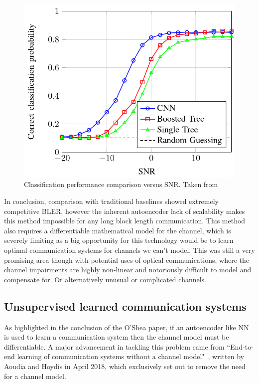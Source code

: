 \documentclass[12pt,onecolumn,letterpaper]{article}
\newcommand\genfigsize{0.5}
\begin{document}
\begin{figure}[t]
   \centering
   \includegraphics[width=\genfigsize\linewidth]{figures/oShea_CNN_Rx_classification.PNG}
   \caption{Classification performance comparison versus SNR. Taken from~\cite{oShea}}
\label{fig:oSheaCnnRxClassification}
\end{figure}

In conclusion, comparison with traditional baselines showed extremely competitive BLER, however the inherent autoencoder lack of scalability makes this method impossible for any long block length communication. This method also requires a differentiable mathematical model for the channel, which is severely limiting as a big opportunity for this technology would be to learn optimal communication systems for channels we can't model. This was still a very promising area though with potential uses of optical communications, where the channel impairments are highly non-linear and notoriously difficult to model and compensate for. Or alternatively unusual or complicated channels.

\FloatBarrier
\subsection{Unsupervised learned communication systems}

As highlighted in the conclusion of the O'Shea paper, if an autoencoder like NN is used to learn a communication system then the channel model must be  differentiable. A major advancement in tackling this problem came from ``End-to-end learning of communication systems without a channel model"~\cite{Aoudia}, written by Aoudia and Hoydis in April 2018, which exclusively set out to remove the need for a channel model. 
\end{document}
